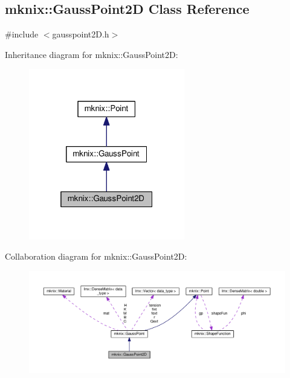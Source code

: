 \hypertarget{classmknix_1_1_gauss_point2_d}{}\subsection{mknix\+:\+:Gauss\+Point2\+D Class Reference}
\label{classmknix_1_1_gauss_point2_d}


{\ttfamily \#include $<$gausspoint2\+D.\+h$>$}



Inheritance diagram for mknix\+:\+:Gauss\+Point2\+D\+:\nopagebreak
\begin{figure}[H]
\begin{center}
\leavevmode
\includegraphics[width=193pt]{d2/db8/classmknix_1_1_gauss_point2_d__inherit__graph}
\end{center}
\end{figure}


Collaboration diagram for mknix\+:\+:Gauss\+Point2\+D\+:\nopagebreak
\begin{figure}[H]
\begin{center}
\leavevmode
\includegraphics[width=350pt]{dd/d41/classmknix_1_1_gauss_point2_d__coll__graph}
\end{center}
\end{figure}
